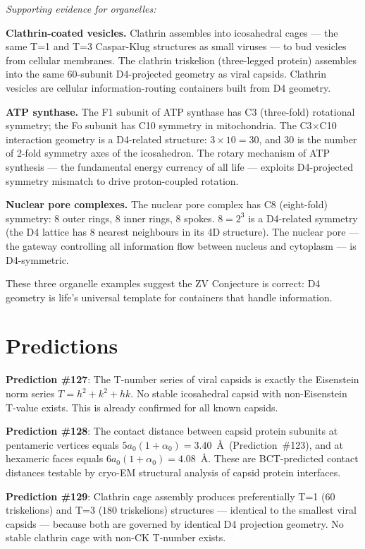 \documentclass[aps,prl,preprint,superscriptaddress,floatfix]{revtex4-2}
\begin{document}
\textit{Supporting evidence for organelles:}

\textbf{Clathrin-coated vesicles.} Clathrin assembles into icosahedral
cages --- the same T=1 and T=3 Caspar-Klug structures as small
viruses --- to bud vesicles from cellular membranes. The clathrin
triskelion (three-legged protein) assembles into the same 60-subunit
D4-projected geometry as viral capsids. Clathrin vesicles are
cellular information-routing containers built from D4 geometry.

\textbf{ATP synthase.} The F1 subunit of ATP synthase has C3
(three-fold) rotational symmetry; the Fo subunit has C10 symmetry
in mitochondria. The C3$\times$C10 interaction geometry is a
D4-related structure: $3 \times 10 = 30$, and 30 is the number of
2-fold symmetry axes of the icosahedron. The rotary mechanism of
ATP synthesis --- the fundamental energy currency of all life ---
exploits D4-projected symmetry mismatch to drive proton-coupled
rotation.

\textbf{Nuclear pore complexes.} The nuclear pore complex has C8
(eight-fold) symmetry: 8 outer rings, 8 inner rings, 8 spokes.
$8 = 2^3$ is a D4-related symmetry (the D4 lattice has 8 nearest
neighbours in its 4D structure). The nuclear pore --- the gateway
controlling all information flow between nucleus and cytoplasm ---
is D4-symmetric.

These three organelle examples suggest the ZV Conjecture is correct:
D4 geometry is life's universal template for containers that handle
information.

\section{Predictions}

\textbf{Prediction \#127}: The T-number series of viral capsids is
exactly the Eisenstein norm series $T = h^2 + k^2 + hk$. No stable
icosahedral capsid with non-Eisenstein T-value exists. This is
already confirmed for all known capsids.

\textbf{Prediction \#128}: The contact distance between capsid
protein subunits at pentameric vertices equals $5a_0(1+\alpha_0)
= 3.40$~\AA\ (Prediction~\#123), and at hexameric faces equals
$6a_0(1+\alpha_0) = 4.08$~\AA. These are BCT-predicted contact
distances testable by cryo-EM structural analysis of capsid protein
interfaces.

\textbf{Prediction \#129}: Clathrin cage assembly produces
preferentially T=1 ($60$ triskelions) and T=3 ($180$ triskelions)
structures --- identical to the smallest viral capsids --- because
both are governed by identical D4 projection geometry. No stable
clathrin cage with non-CK T-number exists.
\end{document}
